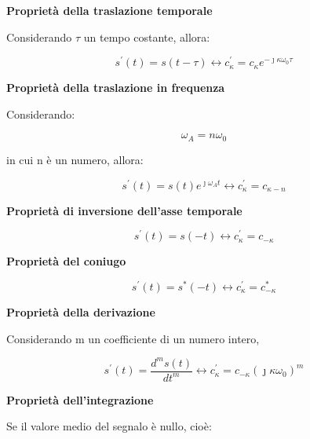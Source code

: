 \textbf{Proprietà della traslazione temporale} 

Considerando $\tau$ un tempo costante, allora: 

{
    \Large 
    \begin{equation}
        s^{'} (t) = s(t - \tau)
        \leftrightarrow
        c_\kappa ^{'}  = c_\kappa e^{-\jmath \kappa \omega_0 \tau} 
    \end{equation}
    \newline
}

 

\textbf{Proprietà della traslazione in frequenza} 

Considerando: 

{
    \Large
    \begin{equation}
        \omega_A = n \omega_0
    \end{equation}
} 

in cui n è un numero, allora: 

{
    \Large 
    \begin{equation}
        s^{'} (t) = s(t) e^{\jmath \omega_A t} 
        \leftrightarrow 
        c_\kappa ^{'} = c_{\kappa - n}
    \end{equation}
}

\textbf{Proprietà di inversione dell'asse temporale} 

{
    \Large 
    \begin{equation}
        s^{'} (t) = s(-t) 
        \leftrightarrow
        c_\kappa ^{'} = c_{-\kappa}
    \end{equation}
} 

\textbf{Proprietà del coniugo} 

{
    \Large 
    \begin{equation}
        s^{'} (t) = s^{*} (-t) 
        \leftrightarrow
        c_\kappa ^{'} = c_{-\kappa} ^{*}
    \end{equation}
} 

\textbf{Proprietà della derivazione} 

Considerando m un coefficiente di un numero intero, 

{
    \Large
    \begin{equation}
        s^{'} (t) = \frac{d ^{m} s(t)}{dt^{m}}
        \leftrightarrow 
        c_\kappa ^{'} = c_{-\kappa} (\jmath \kappa \omega_0)^{m}
    \end{equation}
}

\textbf{Proprietà dell'integrazione}

Se il valore medio del segnalo è nullo, cioè: 

